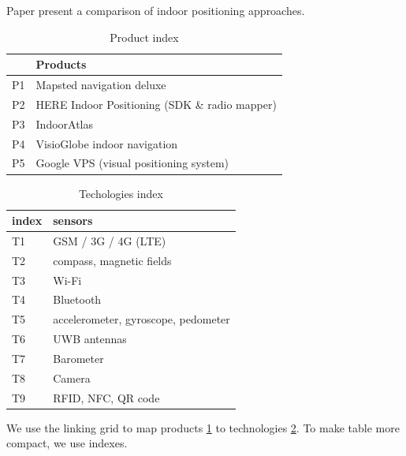 Paper \cite{Brena2017} present a comparison of indoor positioning approaches.


\begin{table}[]
\caption{Product index}
\label{tab:productstolink}
\begin{tabular}{|l|l|}
\hline
 & Products \\ \hline
P1 & Mapsted navigation deluxe \\ \hline
P2 & HERE Indoor Positioning (SDK \& radio mapper) \\ \hline
P3 & IndoorAtlas \\ \hline
P4 & VisioGlobe indoor navigation \\ \hline
P5 & Google VPS (visual positioning system) \\ \hline
\end{tabular}%
\end{table}

\begin{table}[]
\caption{Techologies index}
\label{tab:techindex}
\begin{tabular}{|l|l|}
\hline
index & sensors \\ \hline
T1 & GSM / 3G / 4G (LTE) \\ \hline
T2 & compass, magnetic fields \\ \hline
T3 & Wi-Fi \\ \hline
T4 & Bluetooth \\ \hline
T5 & accelerometer, gyroscope, pedometer \\ \hline
T6 & UWB antennas \\ \hline
T7 & Barometer \\ \hline
T8 & Camera \\ \hline
T9 & RFID, NFC, QR code \\ \hline
\end{tabular}%
\end{table}

We use the linking grid to map products \ref{tab:productstolink} to technologies \ref{tab:techindex}. To make table more compact, we use indexes.  

